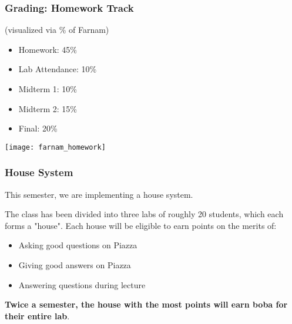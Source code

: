 \documentclass[aspectratio=169]{beamer}
\begin{document}
\begin{frame}[fragile]
  \frametitle{Grading: Homework Track}

  \begin{minipage}{0.59\textwidth}

    (visualized via \% of Farnam) \\

    \vspace{\fill}

    \begin{itemize}
      \item Homework: 45\%
      \item Lab Attendance: 10\%
      \item Midterm 1: 10\%
      \item Midterm 2: 15\%
      \item Final: 20\%
    \end{itemize}
  \end{minipage}
  \begin{minipage}{0.4\textwidth}
    \texttt{[image: farnam\_homework]}
  \end{minipage}
\end{frame}



\begin{frame}[fragile]
  \frametitle{House System}
  
  This semester, we are implementing a house system\footnotemark.  

  \pause
  \vspace{\fill}

  The class has been divided into three labs of roughly 20 students, which each forms a
  "house". Each house will be eligible to earn points on the merits of:
  \pause
  \begin{itemize}
    \item Asking good questions on Piazza \pause 
    \item Giving good answers on Piazza \pause
    \item Answering questions during lecture
  \end{itemize}

  \pause
  \vspace{\fill}

  \textbf{Twice a semester, the house with the most points will earn boba for their entire lab}.

\end{frame}
\end{document}
